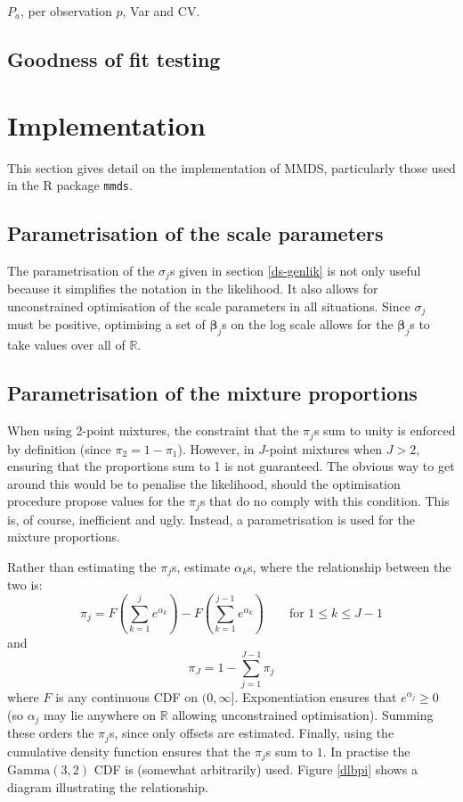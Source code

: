 $P_a$, per observation $p$, Var and CV.

\subsection{Goodness of fit testing}





\section{Implementation}
This section gives detail on the implementation of MMDS, particularly those used in the \textsf{R} package \texttt{mmds}.

\subsection{Parametrisation of the scale parameters}
The parametrisation of the $\sigma_j$s given in section \ref{ds-genlik} is not only useful because it simplifies the notation in the likelihood. It also allows for unconstrained optimisation of the scale parameters in all situations. Since $\sigma_j$ must be positive, optimising a set of $\bm{\beta}_j$s on the log scale allows for the $\bm{\beta}_j$s to take values over all of $\mathbb{R}$.


\subsection{Parametrisation of the mixture proportions}
When using 2-point mixtures, the constraint that the $\pi_j$s sum to unity is enforced by definition (since $\pi_2=1-\pi_1$). However, in $J$-point mixtures when $J>2$, ensuring that the proportions sum to 1 is not guaranteed. The obvious way to get around this would be to penalise the likelihood, should the optimisation procedure propose values for the $\pi_j$s that do no comply with this condition. This is, of course, inefficient and ugly. Instead, a parametrisation is used for the mixture proportions.

Rather than estimating the $\pi_j$s, estimate $\alpha_k$s, where the relationship between the two is:
\begin{equation*}
\pi_j = F(\sum_{k=1}^j e^{\alpha_k}) - F(\sum_{k=1}^{j-1} e^{\alpha_k}) \qquad \text{for } 1\leq k \leq J-1
\end{equation*}
and
\begin{equation*}
\pi_J = 1-\sum_{j=1}^{J-1} \pi_j
\end{equation*}
where $F$ is any continuous CDF on $(0,\infty]$. Exponentiation ensures that $e^{\alpha_j}\geq0$ (so $\alpha_j$ may lie anywhere on $\mathbb{R}$ allowing unconstrained optimisation). Summing these orders the $\pi_j$s, since only offsets are estimated. Finally, using the cumulative density function ensures that the $\pi_j$s sum to $1$. In practise the $\text{Gamma}(3,2)$ CDF is (somewhat arbitrarily) used. Figure \ref{dlbpi} shows a diagram illustrating the relationship.


